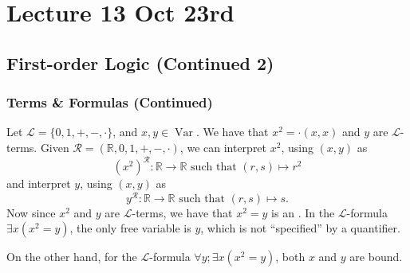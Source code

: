 \documentclass[notoc,notitlepage]{tufte-book}
\DeclareMathOperator{\Var}{Var }
\begin{document}
\chapter{Lecture 13 Oct 23rd}%
\label{chp:lecture_13_oct_23rd}

\section{First-order Logic (Continued 2)}%
\label{sec:first_order_logic_continued_2}

\subsection{Terms \& Formulas (Continued)}%
\label{sub:terms_n_formulas_continued}

\begin{eg}
  Let $\mathcal{L} = \{ 0, 1, +, -, \cdot \}$, and $x, y \in \Var$. We have that $x^2 = \cdot ( x, x )$ and $y$ are $\mathcal{L}$-terms. Given $\mathcal{R} = (\mathbb{R}, 0, 1, + , - , \cdot)$, we can interpret $x^2$, using $(x, y)$ as
  \begin{equation*}
    \left( x^2 \right)^{\mathcal{R}} : \mathbb{R} \to \mathbb{R} \text{ such that } (r, s) \mapsto r^2
  \end{equation*}
  and interpret $y$, using $(x, y)$ as
  \begin{equation*}
    y^\mathcal{R} : \mathbb{R} \to \mathbb{R} \text{ such that } (r, s) \mapsto s.
  \end{equation*}
  Now since $x^2$ and $y$ are $\mathcal{L}$-terms, we have that $x^2 = y$ is an . In the $\mathcal{L}$-formula $\exists x (x^2 = y)$, the only free variable is $y$, which is not ``specified'' by a quantifier.

  On the other hand, for the $\mathcal{L}$-formula $\forall y ; \exists x (x^2 = y)$, both $x$ and $y$ are bound.
\end{eg}
\end{document}
